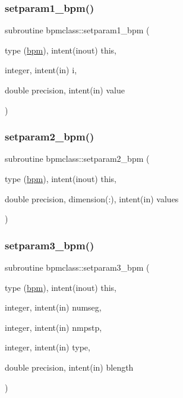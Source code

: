 \mbox{\label{namespacebpmclass_ac6cf17939baa6ee32b20af627036c73e}} 
\subsubsection{\texorpdfstring{setparam1\_bpm()}{setparam1\_bpm()}}
{\footnotesize\ttfamily subroutine bpmclass\+::setparam1\+\_\+bpm (\begin{DoxyParamCaption}\item[{type (\mbox{\hyperlink{namespacebpmclass_structbpmclass_1_1bpm}{bpm}}), intent(inout)}]{this,  }\item[{integer, intent(in)}]{i,  }\item[{double precision, intent(in)}]{value }\end{DoxyParamCaption})}

\mbox{\label{namespacebpmclass_a37f4e426713e3624ee853c1343294cab}} 
\subsubsection{\texorpdfstring{setparam2\_bpm()}{setparam2\_bpm()}}
{\footnotesize\ttfamily subroutine bpmclass\+::setparam2\+\_\+bpm (\begin{DoxyParamCaption}\item[{type (\mbox{\hyperlink{namespacebpmclass_structbpmclass_1_1bpm}{bpm}}), intent(inout)}]{this,  }\item[{double precision, dimension(\+:), intent(in)}]{values }\end{DoxyParamCaption})}

\mbox{\label{namespacebpmclass_a75a67023bf7f429ccd2ef12a435077a7}} 
\subsubsection{\texorpdfstring{setparam3\_bpm()}{setparam3\_bpm()}}
{\footnotesize\ttfamily subroutine bpmclass\+::setparam3\+\_\+bpm (\begin{DoxyParamCaption}\item[{type (\mbox{\hyperlink{namespacebpmclass_structbpmclass_1_1bpm}{bpm}}), intent(inout)}]{this,  }\item[{integer, intent(in)}]{numseg,  }\item[{integer, intent(in)}]{nmpstp,  }\item[{integer, intent(in)}]{type,  }\item[{double precision, intent(in)}]{blength }\end{DoxyParamCaption})}

